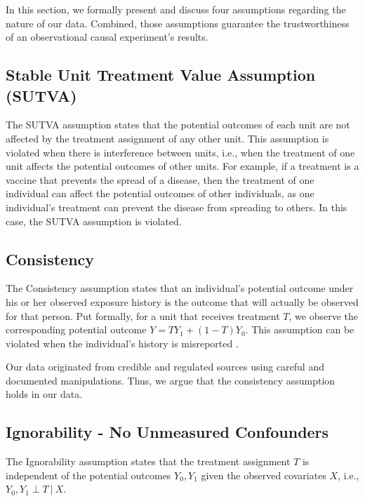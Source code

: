 \documentclass[11pt]{article}
\newcommand{\todo}[1]{{\color{orange}{TODO: #1}}}
\newcommand{\gur}[1]{{\color{teal}{Gur: #1}}}
\begin{document}
In this section, we formally present and discuss four assumptions regarding the nature of our data. Combined, those assumptions guarantee the trustworthiness of an observational causal experiment's results.

\subsection{Stable Unit Treatment Value Assumption (SUTVA)}

The SUTVA assumption states that the potential outcomes of each unit are not affected by the treatment assignment of any other unit. This assumption is violated when there is interference between units, i.e., when the treatment of one unit affects the potential outcomes of other units. For example, if a treatment is a vaccine that prevents the spread of a disease, then the treatment of one individual can affect the potential outcomes of other individuals, as one individual's treatment can prevent the disease from spreading to others. In this case, the SUTVA assumption is violated.

\todo{In our data...}

\subsection{Consistency}

The Consistency assumption states that an individual's potential outcome under his or her observed exposure history is the outcome that will actually be observed for that person. Put formally, for a unit that receives treatment $T$, we observe the corresponding potential outcome $Y = TY_1 + (1-T)Y_0$. This assumption can be violated when the individual's history is misreported \gur{(e.g., "Have you ever tried LSD?)}.

Our data originated from credible and regulated sources using careful and documented manipulations. Thus, we argue that the consistency assumption holds in our data.

\subsection{Ignorability - No Unmeasured Confounders}

The Ignorability assumption states that the treatment assignment $T$ is independent of the potential outcomes $Y_0, Y_1$ given the observed covariates $X$, i.e., $Y_0, Y_1 \perp T \ | \ X$. 

\gur{'Unverifiable assumption.' https://www.ncbi.nlm.nih.gov/pmc/articles/PMC10666970/}
\end{document}
